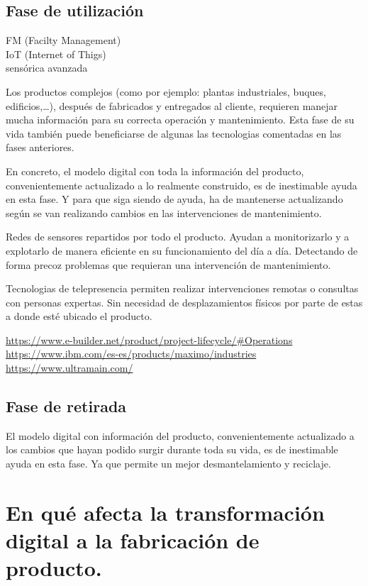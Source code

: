 \documentclass[spanish,12pt,a4paper,final,oneside]{book}
\begin{document}
\section{Fase de utilización}
FM (Facilty Management)
\\IoT (Internet of Thigs)
\\sensórica avanzada

Los productos complejos (como por ejemplo: plantas industriales, buques, edificios,\ldots), después de fabricados y entregados al cliente, requieren manejar mucha información para su correcta operación y mantenimiento. Esta fase de su vida también puede beneficiarse de algunas las tecnologias comentadas en las fases anteriores.

En concreto, el modelo digital con toda la información del producto, convenientemente actualizado a lo realmente construido, es de inestimable ayuda en esta fase. Y para que siga siendo de ayuda, ha de mantenerse actualizando según se van realizando cambios en las intervenciones de mantenimiento.

Redes de sensores repartidos por todo el producto. Ayudan a monitorizarlo y a explotarlo de manera eficiente en su funcionamiento del día a día. Detectando de forma precoz problemas que requieran una intervención de mantenimiento.

Tecnologias de telepresencia permiten realizar intervenciones remotas o consultas con personas expertas. Sin necesidad de desplazamientos  físicos por parte de estas a donde esté ubicado el producto.

\url{https://www.e-builder.net/product/project-lifecycle/#Operations}
\\ \url{https://www.ibm.com/es-es/products/maximo/industries}
\\ \url{https://www.ultramain.com/}


\section{Fase de retirada}

El modelo digital con información del producto, convenientemente actualizado a los cambios que hayan podido surgir durante toda su vida, es de inestimable ayuda en esta fase. Ya que permite un mejor desmantelamiento y reciclaje. 


\chapter{En qué afecta la transformación digital a la fabricación de producto.}
\end{document}
